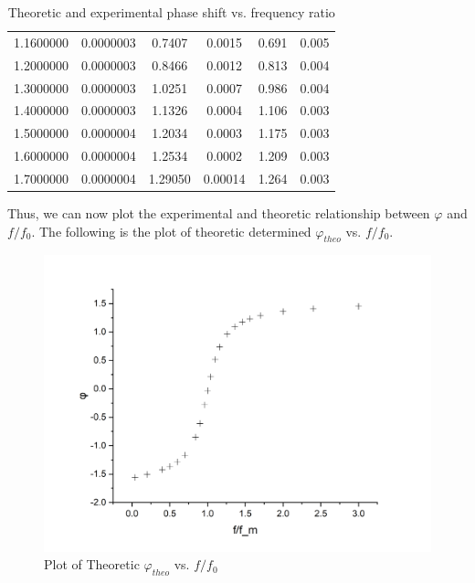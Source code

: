 \documentclass[a4paper]{article}
\begin{document}
\begin{table}[!htbp]
\begin{tabular}{cccccc}
		1.1600000 & 0.0000003   & 0.7407                  & 0.0015                    & 0.691               & 0.005                   \\
		1.2000000 & 0.0000003   & 0.8466                  & 0.0012                    & 0.813               & 0.004                   \\
		1.3000000 & 0.0000003   & 1.0251                  & 0.0007                    & 0.986               & 0.004                   \\
		1.4000000 & 0.0000003   & 1.1326                  & 0.0004                    & 1.106               & 0.003                   \\
		1.5000000 & 0.0000004   & 1.2034                  & 0.0003                    & 1.175               & 0.003                   \\
		1.6000000 & 0.0000004   & 1.2534                  & 0.0002                    & 1.209               & 0.003                   \\
		1.7000000 & 0.0000004   & 1.29050                 & 0.00014                   & 1.264               & 0.003                   \\
		\hline
	\end{tabular}%
	\caption{Theoretic and experimental phase shift vs. frequency ratio}
\end{table}

Thus, we can now plot the experimental and theoretic relationship between $\varphi$ and $f/f_0$. The following is the plot of theoretic determined $\varphi_{theo}$ vs. $f/f_0$.


\begin{figure}[H]
	\center
	\includegraphics[width=12cm]{phase_t.jpg}
	\caption{Plot of Theoretic $\varphi_{theo}$ vs. $f/f_0$}
\end{figure}
\end{document}
